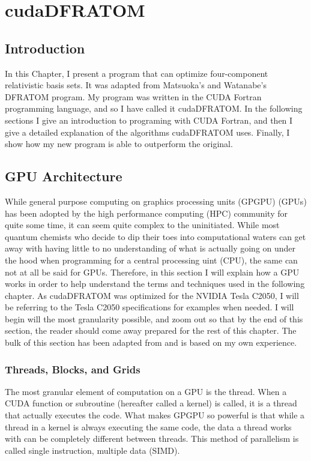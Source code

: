 \chapter{cudaDFRATOM}
\label{chp:cuda_dfratom}
\section{Introduction}
In this Chapter, I present a program that can optimize four-component relativistic basis sets. It was adapted from Matsuoka's and Watanabe's DFRATOM program\cite{MATSUOKA2001218}. My program was written in the CUDA Fortran programming language\cite{cudaFortran_pgi}, and so I have called it cudaDFRATOM. In the following sections I give an introduction to programing with CUDA Fortran, and then I give a detailed explanation of the algorithms cudaDFRATOM uses. Finally, I show how my new program is able to outperform the original.

\section{GPU Architecture}
While general purpose computing on graphics processing units (GPGPU) (GPUs) has been adopted by the high performance computing (HPC) community for quite some time, it can seem quite complex to the uninitiated. While most quantum chemists who decide to dip their toes into computational waters can get away with having little to no understanding of what is actually going on under the hood when programming for a central processing uint (CPU), the same can not at all be said for GPUs. Therefore, in this section I will explain how a GPU works in order to help understand the terms and techniques used in the following chapter. As cudaDFRATOM was optimized for the NVIDIA Tesla C2050, I will be referring to the Tesla C2050 specifications for examples when needed. I will begin will the most granularity possible, and zoom out so that by the end of this section, the reader should come away prepared for the rest of this chapter. The bulk of this section has been adapted from \cite{Ruetsch:2013:CFS:2588277, cudaFortran_pgi} and is based on my own experience.

\subsection{Threads, Blocks, and Grids}
\label{ThBlGr}
The most granular element of computation on a GPU is the thread. When a CUDA function or subroutine (hereafter called a kernel) is called, it is a thread that actually executes the code. What makes GPGPU so powerful is that while a thread in a kernel is always executing the same code, the data a thread works with can be completely different between threads. This method of parallelism is called single instruction, multiple data (SIMD). 

